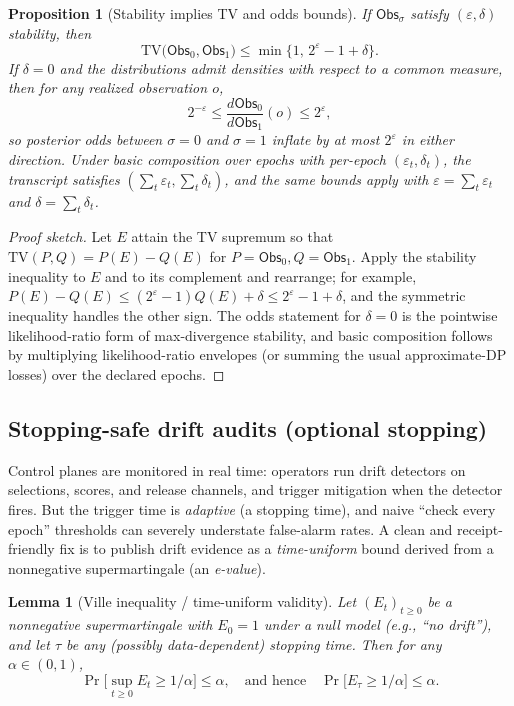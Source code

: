 \documentclass[11pt]{article}
\newtheorem{lemma}{Lemma}
\newtheorem{proposition}{Proposition}
\newcommand{\TV}{\mathrm{TV}}
\begin{document}
\begin{proposition}[Stability implies TV and odds bounds]
\label{prop:dp-to-tv-odds}
If $\mathsf{Obs}_\sigma$ satisfy $(\varepsilon,\delta)$ stability, then
\[
\TV\big(\mathsf{Obs}_0,\mathsf{Obs}_1\big) \le \min\{1,\,2^{\varepsilon}-1+\delta\}.
\]
If $\delta=0$ and the distributions admit densities with respect to a common measure, then for any realized observation $o$,
\[
2^{-\varepsilon} \le \frac{d\mathsf{Obs}_0}{d\mathsf{Obs}_1}(o) \le 2^{\varepsilon},
\]
so posterior odds between $\sigma=0$ and $\sigma=1$ inflate by at most $2^{\varepsilon}$ in either direction.
Under basic composition over epochs with per-epoch $(\varepsilon_t,\delta_t)$, the transcript satisfies $(\sum_t \varepsilon_t,\sum_t \delta_t)$, and the same bounds apply with $\varepsilon=\sum_t\varepsilon_t$ and $\delta=\sum_t\delta_t$.
\end{proposition}

\begin{proof}[Proof sketch]
Let $E$ attain the TV supremum so that $\TV(P,Q)=P(E)-Q(E)$ for $P=\mathsf{Obs}_0,Q=\mathsf{Obs}_1$.
Apply the stability inequality to $E$ and to its complement and rearrange; for example,
$P(E)-Q(E)\le (2^{\varepsilon}-1)Q(E)+\delta\le 2^{\varepsilon}-1+\delta$, and the symmetric inequality handles the other sign.
The odds statement for $\delta=0$ is the pointwise likelihood-ratio form of max-divergence stability, and basic composition follows by multiplying likelihood-ratio envelopes (or summing the usual approximate-DP losses) over the declared epochs.
\end{proof}

\subsection{Stopping-safe drift audits (optional stopping)}
Control planes are monitored in real time: operators run drift detectors on selections, scores, and release channels, and trigger mitigation when the detector fires.
But the trigger time is \emph{adaptive} (a stopping time), and naive ``check every epoch'' thresholds can severely understate false-alarm rates.
A clean and receipt-friendly fix is to publish drift evidence as a \emph{time-uniform} bound derived from a nonnegative supermartingale (an \emph{e-value}).\cite{howard2018cher,wang2020ebh}

\begin{lemma}[Ville inequality / time-uniform validity]
Let $(E_t)_{t\ge 0}$ be a nonnegative supermartingale with $E_0=1$ under a null model (e.g., ``no drift''), and let $\tau$ be any (possibly data-dependent) stopping time.
Then for any $\alpha\in(0,1)$,
\[
\Pr\Big[\sup_{t\ge 0} E_t \ge 1/\alpha\Big] \le \alpha,
\quad\text{and hence}\quad
\Pr\big[E_{\tau}\ge 1/\alpha\big]\le \alpha.
\]
\end{lemma}
\end{document}
